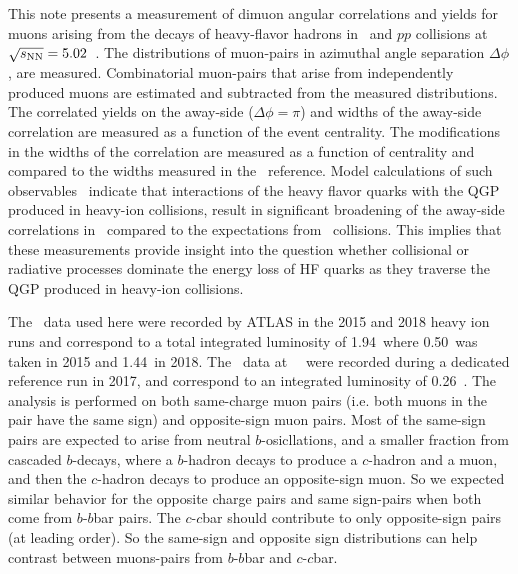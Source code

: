 This note presents a measurement of dimuon angular correlations and yields 
  for muons arising from the decays of heavy-flavor hadrons in \PbPb\ 
  and $pp$ collisions at $\mbox{$\sqrt{s_{\mathrm {NN}}}$}=5.02$~\TeV.
The distributions of muon-pairs in azimuthal angle separation $\Delta\phi$, 
  are measured.
Combinatorial muon-pairs that arise from independently produced muons
  are estimated and subtracted from the measured distributions.
The correlated yields on the away-side ($\Delta\phi=\pi$) and widths of the 
  away-side correlation are measured as a function of the event centrality.
The modifications in the widths of the correlation are measured as 
  a function of centrality and compared to the widths measured in the \pp\ reference.
\iftoggle{IncludeYields}
{
 Similarly, the modifications in the pair-yields in Pb+Pb collisions, as a function of centrality,
  are compared to the \pp\ collisions. 
}
{}
Model calculations of such observables~\cite{Nahrgang:2013saa} indicate that 
  interactions of the heavy flavor quarks with the QGP produced in heavy-ion collisions,
  result in significant broadening of the away-side correlations in \Dphi\
  compared to the expectations from \pp\ collisions.
This implies that these measurements provide insight into the 
  question whether collisional or radiative processes dominate 
  the energy loss of HF quarks as they traverse the 
  QGP produced in heavy-ion collisions.

The \PbPb\ data used here were recorded by ATLAS in the 2015 and 2018 heavy ion runs
  and correspond to a total integrated luminosity of 1.94~\inb where
  0.50\inb\ was taken in 2015 and 1.44\inb\ in 2018.
The \pp\ data at \sqs=5.02~\TeV\ were recorded during a dedicated 
  reference run in 2017, and correspond to an integrated luminosity of 0.26~\ifb.
The analysis is performed on both same-charge muon pairs (i.e. both muons in the pair have the same sign)
  and opposite-sign muon pairs.
Most of the same-sign pairs are expected to arise from neutral $b$-osicllations, 
  and a smaller fraction from cascaded $b$-decays, where a $b$-hadron decays to 
  produce a $c$-hadron and a muon, and then the $c$-hadron decays to produce
  an opposite-sign muon.
So we expected similar behavior for the opposite charge pairs and same sign-pairs 
  when both come from $b$-$b$bar pairs. 
The $c$-$c$bar should contribute to only opposite-sign pairs (at leading order). 
So the same-sign and opposite sign distributions can help contrast 
  between muons-pairs from $b$-$b$bar and $c$-$c$bar.

